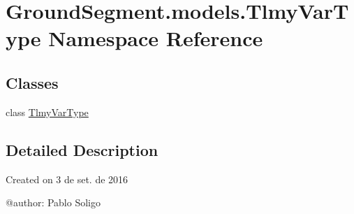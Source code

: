 \hypertarget{namespace_ground_segment_1_1models_1_1_tlmy_var_type}{}\section{Ground\+Segment.\+models.\+Tlmy\+Var\+Type Namespace Reference}
\label{namespace_ground_segment_1_1models_1_1_tlmy_var_type}
\subsection*{Classes}
\begin{DoxyCompactItemize}
\item 
class \hyperlink{class_ground_segment_1_1models_1_1_tlmy_var_type_1_1_tlmy_var_type}{Tlmy\+Var\+Type}
\end{DoxyCompactItemize}


\subsection{Detailed Description}
\begin{DoxyVerb}Created on 3 de set. de 2016

@author: Pablo Soligo
\end{DoxyVerb}
 